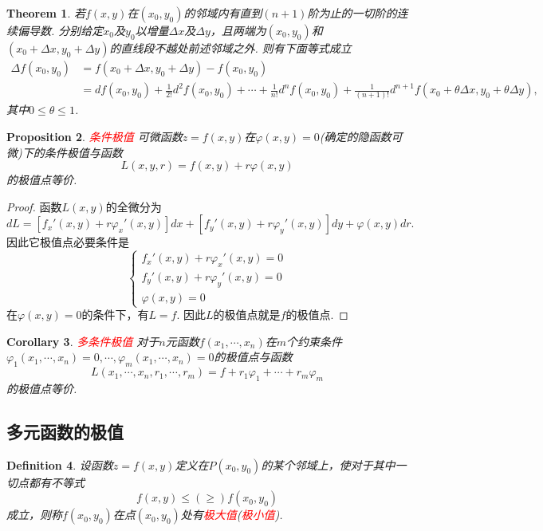 \documentclass{article}
\newtheorem{theorem}{Theorem}[section]
\newtheorem{corollary}[theorem]{Corollary}
\newtheorem{proposition}[theorem]{Proposition}
\newtheorem{definition}[theorem]{Definition}
\newcommand{\redt}[1]{\textcolor{red}{#1}}
\begin{document}
\begin{theorem}
\rm 若$f(x,y)$在$(x_0,y_0)$的邻域内有直到$(n+1)$阶为止的一切阶的连续偏导数. 分别给定$x_0$及$y_0$以增量$\Delta x$及$\Delta y$，且两端为$(x_0,y_0)$和$(x_0+\Delta x , y_0 + \Delta y)$的直线段不越处前述邻域之外. 则有下面等式成立
$$
\begin{array}{ll}
\Delta f(x_0,y_0) &= f(x_0 + \Delta x, y_0 + \Delta y)-f(x_0,y_0) \\
&= df(x_0,y_0) + \frac{1}{2!}d^2f(x_0,y_0) + \cdots + \frac{1}{n!}d^nf(x_0,y_0) + \frac{1}{(n+1)!}d^{n+1}f(x_0+\theta\Delta x, y_0 + \theta\Delta y),
\end{array}
$$
其中$0 \leq \theta \leq 1$. 
\end{theorem}

\begin{proposition}
\rm \redt{条件极值} 可微函数$z=f(x,y)$在$\varphi(x,y)=0$(确定的隐函数可微)下的条件极值与函数
$$
L(x,y,r) = f(x,y)+r\varphi(x,y)
$$
的极值点等价. 
\end{proposition}

\begin{proof}
\rm 函数$L(x,y)$的全微分为
$$
dL = [f_x'(x,y) + r\varphi_x'(x,y)]dx + [f_y'(x,y) + r\varphi_y'(x,y)]dy + \varphi(x,y)dr.
$$
因此它极值点必要条件是
$$
\left \{
\begin{array}{ll}
f_x'(x,y) + r\varphi_x'(x,y) = 0 \\
f_y'(x,y) + r\varphi_y'(x,y) = 0 \\
\varphi(x,y) = 0
\end{array} \right.
$$
在$\varphi(x,y)=0$的条件下，有$L=f$. 因此$L$的极值点就是$f$的极值点. 
\end{proof}

\begin{corollary}
\rm \redt{多条件极值} 对于$n$元函数$f(x_1,\cdots,x_n)$在$m$个约束条件$\varphi_1(x_1,\cdots,x_n) = 0,\cdots,\varphi_m(x_1,\cdots,x_n) = 0$的极值点与函数
$$
L(x_1,\cdots,x_n,r_1,\cdots,r_m) = f + r_1\varphi_1 + \cdots + r_m\varphi_m
$$
的极值点等价. 
\end{corollary}

\subsection{多元函数的极值}

\begin{definition}
\rm 设函数$z=f(x,y)$定义在$P(x_0,y_0)$的某个邻域上，使对于其中一切点都有不等式
$$
f(x,y) \leq (\geq) f(x_0,y_0)
$$
成立，则称$f(x_0,y_0)$在点$(x_0,y_0)$处有\redt{极大值}(\redt{极小值}).
\end{definition}
\end{document}
